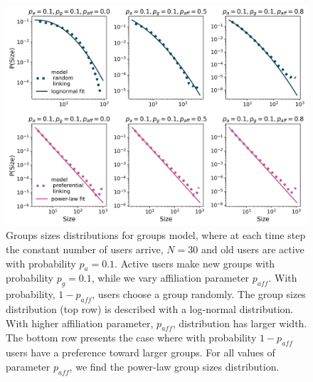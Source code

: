 \begin{figure}[!h]
	\centering
	\includegraphics[width=\linewidth]{figures/model_N30.png}
	\caption{Groups sizes distributions for groups model, where at each time step the constant number of users arrive, $N=30$ and old users are active with probability $p_a=0.1$. Active users make new groups with probability $p_g=0.1$, while we vary affiliation parameter $p_{aff}$. With probability, $1-p_{aff}$, users choose a group randomly. The group sizes distribution (top row) is described with a log-normal distribution. With higher affiliation parameter, $p_{aff}$, distribution has larger width. The bottom row presents the case where with probability $1-p_{aff}$ users have a preference toward larger groups. For all values of parameter $p_{aff}$, we find the power-law group sizes distribution.}
	\label{fig:model_comp}
\end{figure}

